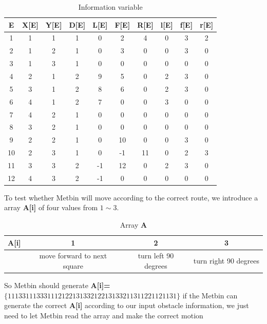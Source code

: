 \documentclass[12pt]{article}
\begin{document}
\begin{table}[H]
\centering
\begin{tabular}{|c|c|c|c|c|c|c|c|c|c|}
\hline
\textbf{E}  & \textbf{X[E]}  & \textbf{Y[E]} & \textbf{D[E]} & \textbf{L[E]} & \textbf{F[E]} & \textbf{R[E]} & \textbf{l[E]} & \textbf{f[E]} & \textbf{r[E]} \\ \hline
1  & 1        & 1        & 1        & 0        & 2        & 4        & 0        & 3        & 2        \\ \hline
2  & 1        & 2        & 1        & 0        & 3        & 0        & 0        & 3        & 0        \\ \hline
3  & 1        & 3        & 1        & 0        & 0        & 0        & 0        & 0        & 0        \\ \hline
4  & 2        & 1        & 2        & 9        & 5        & 0        & 2        & 3        & 0        \\ \hline
5  & 3        & 1        & 2        & 8        & 6        & 0        & 2        & 3        & 0        \\ \hline
6  & 4        & 1        & 2        & 7        & 0        & 0        & 3        & 0        & 0        \\ \hline
7  & 4        & 2        & 1        & 0        & 0        & 0        & 0        & 0        & 0        \\ \hline
8  & 3        & 2        & 1        & 0        & 0        & 0        & 0        & 0        & 0        \\ \hline
9  & 2        & 2        & 1        & 0        & 10       & 0        & 0        & 3        & 0        \\ \hline
10 & 2        & 3        & 1        & 0        & -1       & 11       & 0        & 2        & 3        \\ \hline
11 & 3        & 3        & 2        & -1       & 12       & 0        & 2        & 3        & 0        \\ \hline
12 & 4        & 3        & 2        & -1       & 0        & 0        & 0        & 0        & 0        \\ \hline
\end{tabular}
\caption{Information variable}
\end{table}
To test whether Metbin will move according to the correct route, we introduce a array \textbf{A[i]} of four values from $1\sim3$. 
\begin{table}[H]
\centering
\begin{tabular}{|c|c|c|c|}
\hline
\textbf{A[i]} & 1                           & 2                    & 3                     \\ \hline
         & move forward to next square & turn left 90 degrees & turn right 90 degrees \\ \hline
\end{tabular}
\caption{Array \textbf{A}}
\end{table}
So Metbin should generate \textbf{A[i]=$\lbrace 11133111333111212213133212213133211311221121131\rbrace$}
if the Metbin can generate the correct \textbf{A[i]} according to our input obstacle information, we just need to let Metbin read the array and make the correct motion
\end{document}
